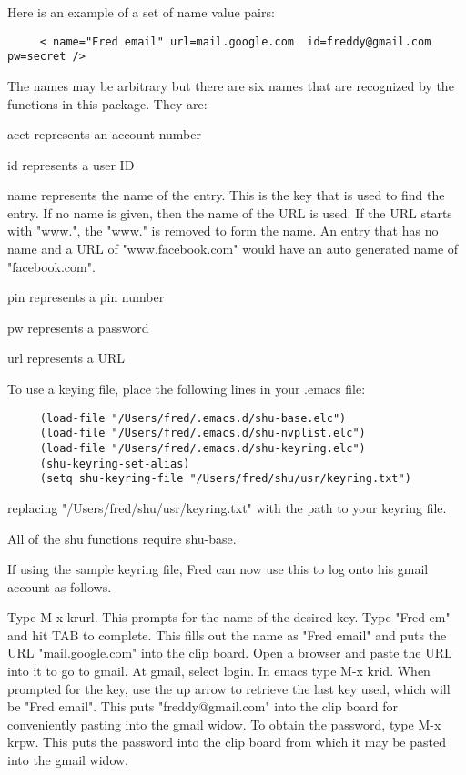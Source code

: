 Here is an example of a set of name value pairs:

\small{\begin{verbatim}
     < name="Fred email" url=mail.google.com  id=freddy@gmail.com  pw=secret />
\end{verbatim}}

The names may be arbitrary but there are six names that are recognized by the
functions in this package.  They are:

acct represents an account number

id represents a user ID

name represents the name of the entry.  This is the key that is used to find
the entry.  If no name is given, then the name of the URL is used.  If the URL
starts with "www.", the "www." is removed to form the name.  An entry that has
no name and a URL of "www.facebook.com" would have an auto generated name of
"facebook.com".

pin represents a pin number

pw represents a password

url represents a URL

To use a keying file, place the following lines in your .emacs file:

\small{\begin{verbatim}
     (load-file "/Users/fred/.emacs.d/shu-base.elc")
     (load-file "/Users/fred/.emacs.d/shu-nvplist.elc")
     (load-file "/Users/fred/.emacs.d/shu-keyring.elc")
     (shu-keyring-set-alias)
     (setq shu-keyring-file "/Users/fred/shu/usr/keyring.txt")
\end{verbatim}}

replacing "/Users/fred/shu/usr/keyring.txt" with the path to your keyring file.

All of the shu functions require shu-base.

If using the sample keyring file, Fred can now use this to log onto his gmail
account as follows.

Type M-x krurl.  This prompts for the name of the desired key.  Type "Fred em"
and hit TAB to complete.  This fills out the name as "Fred email" and puts the
URL "mail.google.com" into the clip board.  Open a browser and paste the URL
into it to go to gmail.  At gmail, select login.  In emacs type M-x krid.
When prompted for the key, use the up arrow to retrieve the last key used,
which will be "Fred email".  This puts "freddy@gmail.com" into the clip board
for conveniently pasting into the gmail widow.  To obtain the password, type
M-x krpw.  This puts the password into the clip board from which it may be
pasted into the gmail widow.


